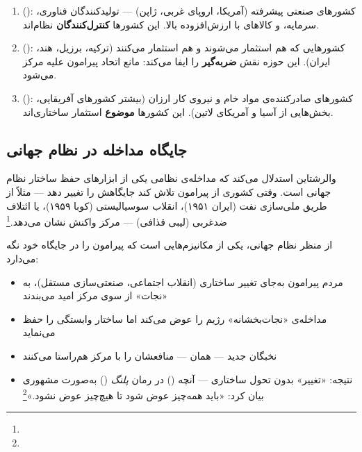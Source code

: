 \begin{tcolorbox}[defbox, title={ساختار سه‌لایه‌ای نظام جهانی والرشتاین}]
\begin{enumerate}
\item {} (): کشورهای صنعتی پیشرفته (آمریکا، اروپای غربی، ژاپن) — تولیدکنندگان فناوری، سرمایه، و کالاهای با ارزش‌افزوده بالا. این کشورها \textbf{کنترل‌کنندگان} نظام‌اند.

\item {} (): کشورهایی که هم استثمار می‌شوند و هم استثمار می‌کنند (ترکیه، برزیل، هند، ایران). این حوزه نقش \textbf{ضربه‌گیر} را ایفا می‌کند: مانع اتحاد پیرامون علیه مرکز می‌شود.

\item {} (): کشورهای صادرکننده‌ی مواد خام و نیروی کار ارزان (بیشتر کشورهای آفریقایی، بخش‌هایی از آسیا و آمریکای لاتین). این کشورها \textbf{موضوع} استثمار ساختاری‌اند.
\end{enumerate}
\end{tcolorbox}

\subsection{جایگاه مداخله در نظام جهانی}
\label{subsec:ch12-intervention-world-system}

والرشتاین استدلال می‌کند که مداخله‌ی نظامی یکی از ابزارهای حفظ ساختار نظام جهانی است. وقتی کشوری از پیرامون تلاش کند جایگاهش را تغییر دهد — مثلاً از طریق ملی‌سازی نفت (ایران ۱۹۵۱)، انقلاب سوسیالیستی (کوبا ۱۹۵۹)، یا ائتلاف ضدغربی (لیبی قذافی) — مرکز واکنش نشان می‌دهد.\footnote{}

\begin{tcolorbox}[wavebox, title={والرشتاین و نجات‌طلبی}]
از منظر نظام جهانی،  یکی از مکانیزم‌هایی است که پیرامون را در جایگاه خود نگه می‌دارد:
\begin{itemize}
\item مردم پیرامون به‌جای تغییر ساختاری (انقلاب اجتماعی، صنعتی‌سازی مستقل)، به «نجات» از سوی مرکز امید می‌بندند
\item مداخله‌ی «نجات‌بخشانه» رژیم را عوض می‌کند اما ساختار وابستگی را حفظ می‌نماید
\item نخبگان جدید — همان  — منافعشان را با مرکز هم‌راستا می‌کنند
\item نتیجه: «تغییر» بدون تحول ساختاری — آنچه  () در رمان \textit{پلنگ} () به‌صورت مشهوری بیان کرد: «باید همه‌چیز عوض شود تا هیچ‌چیز عوض نشود.»\footnote{}
\end{itemize}
\end{tcolorbox}

